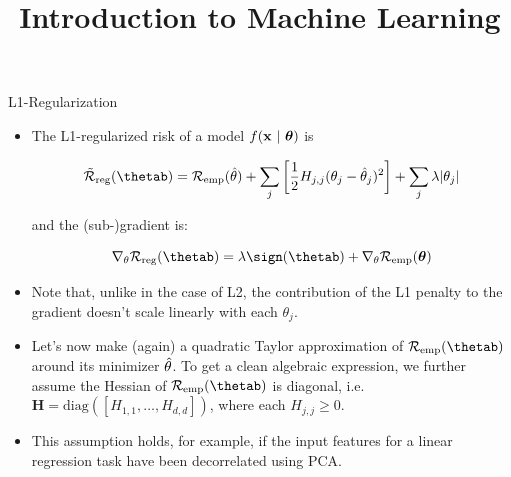 \documentclass[11pt,compress,t,notes=noshow, xcolor=table]{beamer}
\title{Introduction to Machine Learning}
\date{}
\begin{document}

\begin{vbframe} {L1-Regularization}
  

  \begin{itemize}
    \item The L1-regularized risk of a model $f(\mathbf{x} ~|~ \bm{\theta})$ is

      \[
     \mathcal{\tilde R}_{\text{reg}}(\thetab) = \mathcal{R}_{\text{emp}}(\thetah) + \sum_j \left[ \frac{1}{2} H_{j,j} (\theta_j - \hat{\theta}_j)^2 \right] + \sum_j \lambda |\theta_j|
      \] 
      
      and the (sub-)gradient is:
      
      $$\nabla_{\theta} \mathcal{R}_{\text{reg}}(\thetab) = \lambda \sign(\thetab) + \nabla_{\theta} \risket$$

    \item Note that, unlike in the case of L2, the contribution of the L1 penalty to the gradient doesn't scale linearly with each $\theta_j$. 
    \item Let's now make (again) a quadratic Taylor approximation of $\mathcal{R}_{\text{emp}}(\thetab)$ around its minimizer $\hat{\theta}$. To get a clean algebraic expression, we further assume the Hessian of $\mathcal{R}_{\text{emp}}(\thetab)$ is diagonal, i.e. $\bm{H} = \text{diag}([H_{1,1}, \ldots , H_{d,d}])$, where each $H_{j,j} \geq 0$.
    \item This assumption holds, for example, if the input features for a linear regression task have been decorrelated using PCA.
  \end{itemize}
  
  \framebreak
  

\end{vbframe}
\end{document}
